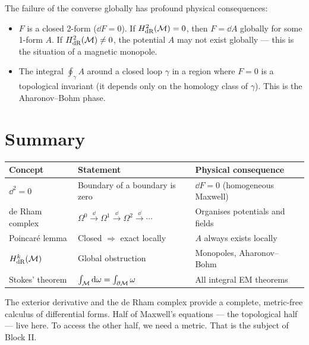 The failure of the converse globally has profound physical consequences:
\begin{itemize}
\item $F$ is a closed 2-form ($\dd F = 0$). If $H^2_{\text{dR}}(\mathcal{M}) = 0$, then $F = \dd A$ globally for some 1-form $A$. If $H^2_{\text{dR}}(\mathcal{M}) \neq 0$, the potential $A$ may not exist globally --- this is the situation of a magnetic monopole.
\item The integral $\oint_\gamma A$ around a closed loop $\gamma$ in a region where $F = 0$ is a topological invariant (it depends only on the homology class of $\gamma$). This is the Aharonov--Bohm phase.
\end{itemize}

\section{Summary}

\begin{table}[h]
\centering
\renewcommand{\arraystretch}{1.4}
\begin{tabular}{lll}
\toprule
\textbf{Concept} & \textbf{Statement} & \textbf{Physical consequence} \\
\midrule
$\dd^2 = 0$ & Boundary of a boundary is zero & $\dd F = 0$ (homogeneous Maxwell) \\
de Rham complex & $\Omega^0 \xrightarrow{\dd} \Omega^1 \xrightarrow{\dd} \Omega^2 \xrightarrow{\dd} \cdots$ & Organises potentials and fields \\
Poincar\'e lemma & Closed $\Rightarrow$ exact locally & $A$ always exists locally \\
$H^k_{\text{dR}}(\mathcal{M})$ & Global obstruction & Monopoles, Aharonov--Bohm \\
Stokes' theorem & $\int_{\mathcal{M}} \mathrm{d}\omega = \int_{\partial\mathcal{M}}\omega$ & All integral EM theorems \\
\bottomrule
\end{tabular}
\end{table}

The exterior derivative and the de Rham complex provide a complete, metric-free calculus of differential forms. Half of Maxwell's equations --- the topological half --- live here. To access the other half, we need a metric. That is the subject of Block II.
